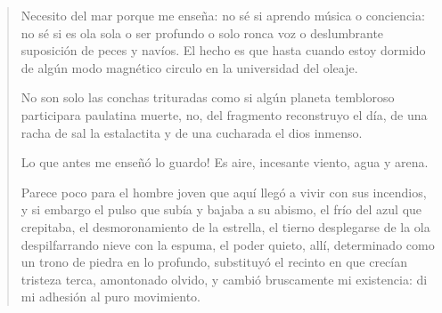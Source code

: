 \documentclass[12pt]{article}
\begin{document}
\clearpage
{}
\begin{verse}
Necesito del mar porque me enseña:  
no sé si aprendo música o conciencia:  
no sé si es ola sola o ser profundo  
o solo ronca voz o deslumbrante  
suposición de peces y navíos.  
El hecho es que hasta cuando estoy dormido  
de algún modo magnético circulo  
en la universidad del oleaje.  

No son solo las conchas trituradas  
como si algún planeta tembloroso  
participara paulatina muerte,  
no, del fragmento reconstruyo el día,  
de una racha de sal la estalactita  
y de una cucharada el dios inmenso.  

Lo que antes me enseñó lo guardo! Es aire,  
incesante viento, agua y arena.  

Parece poco para el hombre joven  
que aquí llegó a vivir con sus incendios,  
y si embargo el pulso que subía  
y bajaba a su abismo,  
el frío del azul que crepitaba,  
el desmoronamiento de la estrella,  
el tierno desplegarse de la ola  
despilfarrando nieve con la espuma,  
el poder quieto, allí, determinado  
como un trono de piedra en lo profundo,  
substituyó el recinto en que crecían  
tristeza terca, amontonado olvido,  
y cambió bruscamente mi existencia:  
di mi adhesión al puro movimiento.  

\end{verse}
\end{document}

